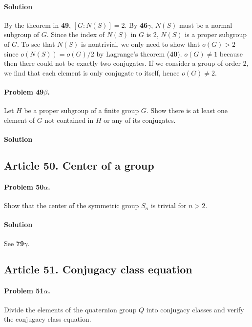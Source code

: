 \paragraph*{Solution}
By the theorem in \textbf{49}, $[G : N(S)] = 2$. By \textbf{46$\gamma$}, $N(S)$
must be a normal subgroup of $G$. Since the index of $N(S)$ in $G$ is 2, $N(S)$ is a
proper subgroup of $G$. To see that $N(S)$ is nontrivial, we only need to show
that $o(G) > 2$ since $o(N(S)) = o(G)/2$ by Lagrange's theorem (\textbf{40}).
$o(G) \neq 1$ because then there could not be exactly two conjugates. If we
consider a group of order 2, we find that each element is only conjugate to
itself, hence $o(G) \neq 2$.

\paragraph{Problem 49$\beta$.}
Let $H$ be a proper subgroup of a finite group $G$. Show there is at least
one element of $G$ not contained in $H$ or any of its conjugates.

\paragraph*{Solution}

\subsection{Article 50. Center of a group}

\paragraph{Problem 50$\alpha$.}
Show that the center of the symmetric group $S_n$ is trivial for $n > 2$.

\paragraph*{Solution}
See \textbf{79$\gamma$}.

\subsection{Article 51. Conjugacy class equation}

\paragraph{Problem 51$\alpha$.}
Divide the elements of the quaternion group $Q$ into conjugacy classes and
verify the conjugacy class equation.

